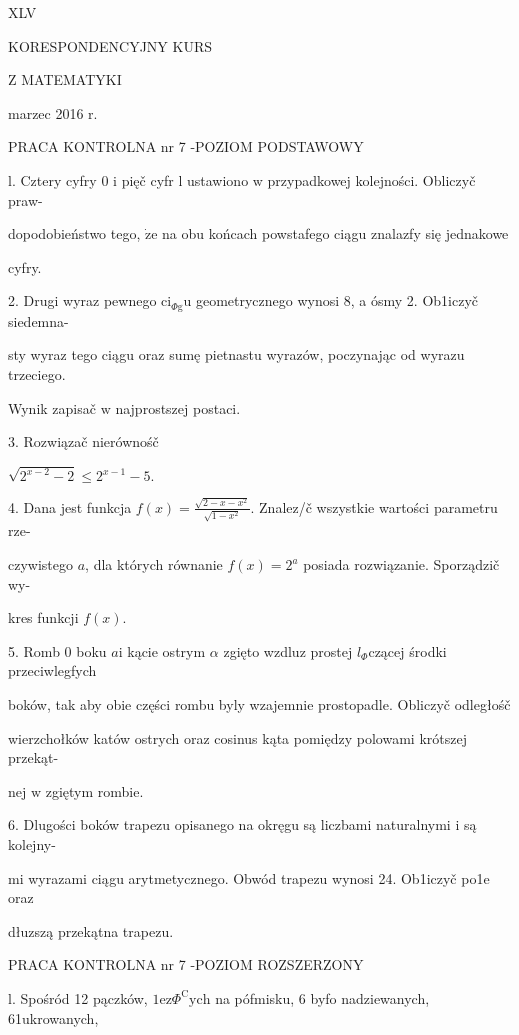 \documentclass[a4paper,12pt]{article}
\begin{document}
XLV

KORESPONDENCYJNY KURS

Z MATEMATYKI

marzec 2016 r.

PRACA KONTROLNA nr 7 -POZIOM PODSTAWOWY

l. Cztery cyfry 0 $\mathrm{i}$ pięč cyfr l ustawiono $\mathrm{w}$ przypadkowej kolejności. Obliczyč praw-

dopodobieństwo tego, $\dot{\mathrm{z}}\mathrm{e}$ na obu końcach powstafego ciągu znalazfy się jednakowe

cyfry.

2. Drugi wyraz pewnego $\mathrm{c}\mathrm{i}_{\Phi \mathrm{g}}\mathrm{u}$ geometrycznego wynosi 8, a ósmy 2. Ob1iczyč siedemna-

sty wyraz tego ciągu oraz sumę pietnastu wyrazów, poczynając od wyrazu trzeciego.

Wynik zapisač $\mathrm{w}$ najprostszej postaci.

3. Rozwiązač nierównośč

$\sqrt{2^{x-2}-2}\leq 2^{x-1}-5.$

4. Dana jest funkcja $f(x)=\displaystyle \frac{\sqrt{2-x-x^{2}}}{\sqrt{1-x^{2}}}$. Znalez/č wszystkie wartości parametru rze-

czywistego $a$, dla których równanie $f(x)=2^{a}$ posiada rozwiązanie. Sporządzič wy-

kres funkcji $f(x).$

5. Romb $0$ boku $a\mathrm{i}$ kącie ostrym $\alpha$ zgięto wzdluz prostej $l_{\Phi}$czącej środki przeciwlegfych

boków, tak aby obie części rombu byly wzajemnie prostopadle. Obliczyč odległośč

wierzchołków katów ostrych oraz cosinus kąta pomiędzy polowami krótszej przekąt-

nej $\mathrm{w}$ zgiętym rombie.

6. Dlugości boków trapezu opisanego na okręgu są liczbami naturalnymi $\mathrm{i}$ są kolejny-

mi wyrazami ciągu arytmetycznego. Obwód trapezu wynosi 24. Ob1iczyč po1e oraz

dłuzszą przekątna trapezu.




PRACA KONTROLNA nr 7 -POZIOM ROZSZERZONY

l. Spośród 12 pączków, $1\mathrm{e}\mathrm{z}\Phi^{\mathrm{C}}\mathrm{y}\mathrm{c}\mathrm{h}$ na pófmisku, 6 byfo nadziewanych, 61ukrowanych,
\end{document}
